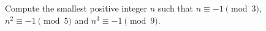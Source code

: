 Compute the smallest positive integer $n$ such that $n\equiv-1\pmod3$, $n^2\equiv-1\pmod5$ and $n^3\equiv-1\pmod9$.
